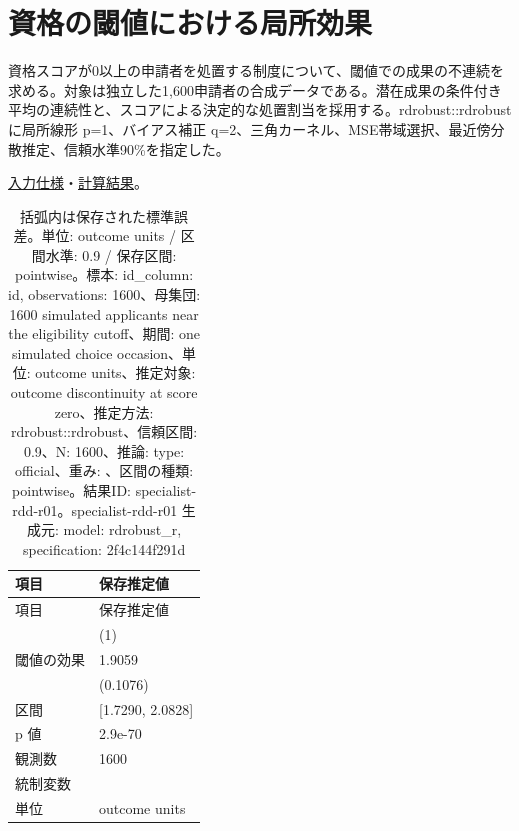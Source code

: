 \documentclass[ecta,nameyear,draft]{econsocart}
\begin{document}
\begin{minipage}{\linewidth}

\section{資格の閾値における局所効果}\label{result-5}

資格スコアが0以上の申請者を処置する制度について、閾値での成果の不連続を求める。対象は独立した1,600申請者の合成データである。潜在成果の条件付き平均の連続性と、スコアによる決定的な処置割当を採用する。rdrobust::rdrobust
に局所線形 p=1、バイアス補正
q=2、三角カーネル、MSE帯域選択、最近傍分散推定、信頼水準90\%を指定した。

\href{https://github.com/yoshimurahiroki/econ-project-mini/blob/f9093ba87cabce7bee1fdf3391656544617a8cb9/examples/research-workspace/models/rdd-spec.json}{入力仕様}・\href{https://github.com/yoshimurahiroki/econ-project-mini/blob/f9093ba87cabce7bee1fdf3391656544617a8cb9/examples/research-workspace/models/rdd-result.json}{計算結果}。

\begin{longtable}[]{@{}ll@{}}
\caption{括弧内は保存された標準誤差。単位: outcome units / 区間水準: 0.9
/ 保存区間: pointwise。標本: id\_column: id, observations: 1600、母集団:
1600 simulated applicants near the eligibility cutoff、期間: one
simulated choice occasion、単位: outcome units、推定対象: outcome
discontinuity at score zero、推定方法: rdrobust::rdrobust、信頼区間:
0.9、N: 1600、推論: type: official、重み: 、区間の種類:
pointwise。結果ID: specialist-rdd-r01。specialist-rdd-r01 生成元: model:
rdrobust\_r, specification: 2f4c144f291d}\tabularnewline
\toprule\noalign{}
項目 & 保存推定値 \\
\midrule\noalign{}
\endfirsthead
\toprule\noalign{}
項目 & 保存推定値 \\
\midrule\noalign{}
\endhead
\bottomrule\noalign{}
\endlastfoot
& (1) \\
閾値の効果 & 1.9059 \\
& (0.1076) \\
区間 & {[}1.7290, 2.0828{]} \\
p 値 & 2.9e-70 \\
観測数 & 1600 \\
統制変数 & \\
単位 & outcome units \\
\end{longtable}

\end{minipage}
\end{document}
